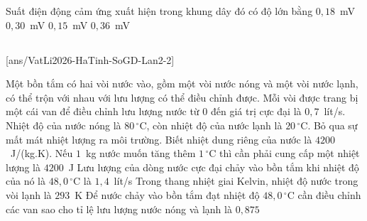 	\begin{ex}%
		\label{HaTinh-SoGD-Lan2-I18}
		Suất điện động cảm ứng xuất hiện trong khung dây đó có độ lớn bằng
		\choice
		{$0{,}18$~mV}
		{$0{,}30$~mV}
		{\True $0{,}15$~mV}
		{$0{,}36$~mV}
	\end{ex}

	\subsection*{}
	\setcounter{ex}{0}
	[ans/VatLi2026-HaTinh-SoGD-Lan2-2]

	\begin{ex}%
		Một bồn tắm có hai vòi nước vào, gồm một vòi nước nóng và một vòi nước lạnh, có thể trộn với nhau với lưu lượng có thể điều chỉnh được. Mỗi vòi được trang bị một cái van để điều chỉnh lưu lượng nước từ $0$ đến giá trị cực đại là $0{,}7$~lít/s. Nhiệt độ của nước nóng là $80\,^\circ\text{C}$, còn nhiệt độ của nước lạnh là $20\,^\circ\text{C}$. Bỏ qua sự mất mát nhiệt lượng ra môi trường. Biết nhiệt dung riêng của nước là $4200$~J/(kg.K).
		\choiceTFt
		{\True Nếu $1$~kg nước muốn tăng thêm $1\,^\circ\text{C}$ thì cần phải cung cấp một nhiệt lượng là $4200$~J}
		{Lưu lượng của dòng nước cực đại chảy vào bồn tắm khi nhiệt độ của nó là $48{,}0\,^\circ\text{C}$ là $1{,}4$~lít/s}
		{\True Trong thang nhiệt giai Kelvin, nhiệt độ nước trong vòi lạnh là $293$~K}
		{\True Để nước chảy vào bồn tắm đạt nhiệt độ $48{,}0\,^\circ\text{C}$ cần điều chỉnh các van sao cho tỉ lệ lưu lượng nước nóng và lạnh là $0{,}875$}
	\end{ex}


